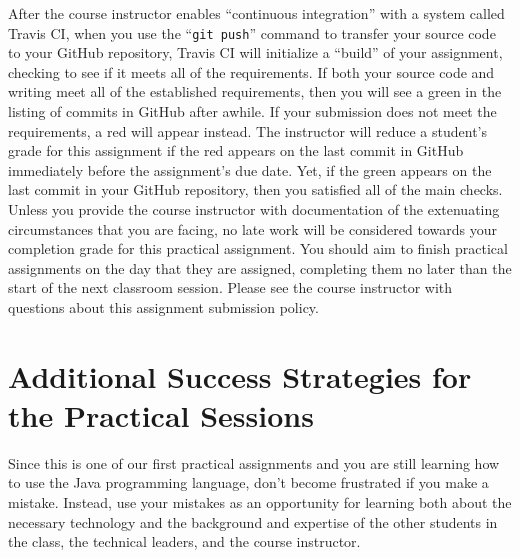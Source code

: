 \documentclass[11pt]{article}
\newcommand{\gitpush}{\command{git push}}
\newcommand{\command}[1]{``\lstinline{#1}''}
\newcommand{\step}[1]{``{#1}''}
\newcommand{\checkmark}{\ding{51}}
\newcommand{\naughtmark}{\ding{55}}
\begin{document}
After the course instructor enables \step{continuous integration} with a system
called Travis CI, when you use the \gitpush{} command to transfer your source
code to your GitHub repository, Travis CI will initialize a \step{build} of your
assignment, checking to see if it meets all of the requirements. If both your
source code and writing meet all of the established requirements, then you will
see a green \checkmark{} in the listing of commits in GitHub after awhile. If
your submission does not meet the requirements, a red \naughtmark{} will appear
instead. The instructor will reduce a student's grade for this assignment if the
red \naughtmark{} appears on the last commit in GitHub immediately before the
assignment's due date. Yet, if the green \checkmark{} appears on the last commit
in your GitHub repository, then you satisfied all of the main checks. Unless you
provide the course instructor with documentation of the extenuating
circumstances that you are facing, no late work will be considered towards your
completion grade for this practical assignment. You should aim to finish
practical assignments on the day that they are assigned, completing them no
later than the start of the next classroom session.
%
Please see the course instructor with questions about this assignment submission
policy.


\section*{Additional Success Strategies for the Practical Sessions}

Since this is one of our first practical assignments and you are still learning
how to use the Java programming language, don't become frustrated if you make a
mistake. Instead, use your mistakes as an opportunity for learning both about
the necessary technology and the background and expertise of the other students
in the class, the technical leaders, and the course instructor.
\end{document}
